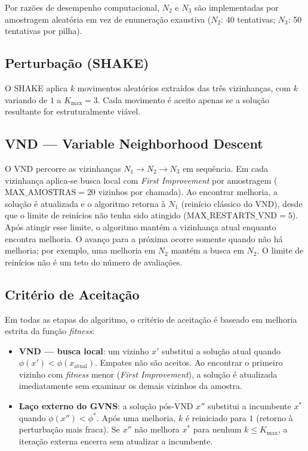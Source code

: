 \documentclass[12pt,a4paper]{article}
\begin{document}
Por razões de desempenho computacional, $N_2$ e $N_3$ são implementadas
por amostragem aleatória em vez de enumeração exaustiva ($N_2$: 40
tentativas; $N_3$: 50 tentativas por pilha).


\subsection{Perturbação (SHAKE)}

O SHAKE aplica $k$ movimentos aleatórios extraídos das três vizinhanças,
com $k$ variando de $1$ a $K_{\max} = 3$. Cada movimento é aceito apenas
se a solução resultante for estruturalmente viável.


\subsection{VND — Variable Neighborhood Descent}

O VND percorre as vizinhanças $N_1 \to N_2 \to N_3$ em sequência.
Em cada vizinhança aplica-se busca local com \textit{First Improvement}
por amostragem ($\text{MAX\_AMOSTRAS} = 20$ vizinhos por chamada).
Ao encontrar melhoria, a solução é atualizada e o algoritmo retorna à $N_1$
(reinício clássico do VND), desde que o limite de reinícios não tenha sido
atingido ($\text{MAX\_RESTARTS\_VND} = 5$). Após atingir esse limite, o
algoritmo mantém a vizinhança atual enquanto encontra melhoria. O avanço
para a próxima ocorre somente quando não há melhoria; por exemplo, uma
melhoria em $N_2$ mantém a busca em $N_2$. O limite de reinícios não é
um teto do número de avaliações.


\subsection{Critério de Aceitação}

Em todas as etapas do algoritmo, o critério de aceitação é baseado em
melhoria estrita da função \textit{fitness}:

\begin{itemize}
    \item \textbf{VND --- busca local}: um vizinho $x'$ substitui a
    solução atual quando $\phi(x') < \phi(x_{\text{atual}})$. Empates
    não são aceitos. Ao encontrar o primeiro vizinho com \textit{fitness}
    menor (\textit{First Improvement}), a solução é atualizada imediatamente
    sem examinar os demais vizinhos da amostra.

    \item \textbf{Laço externo do GVNS}: a solução pós-VND $x''$ substitui
    a incumbente $x^*$ quando $\phi(x'') < \phi^*$. Após uma melhoria,
    $k$ é reiniciado para $1$ (retorno à perturbação mais fraca). Se $x''$
    não melhora $x^*$ para nenhum $k \leq K_{\max}$, a iteração externa
    encerra sem atualizar a incumbente.
\end{itemize}
\end{document}
